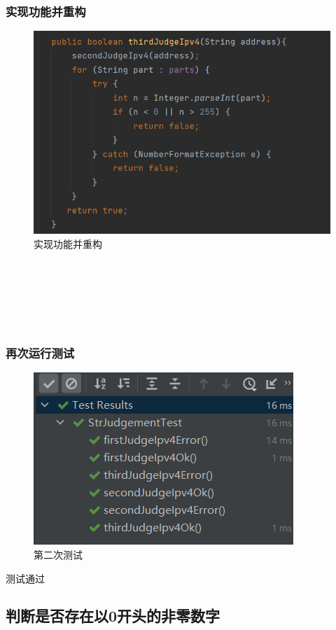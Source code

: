 \documentclass[a4paper]{article}
\begin{document}
\subsubsection*{实现功能并重构}
\begin{figure}[h]
    \centering
    \includegraphics[scale=0.8]{3.4.png}
    \caption{实现功能并重构}
    \label{fig:15}
\end{figure}
~\\~\\~\\~\\~\\
\subsubsection*{再次运行测试}
\begin{figure}[h]
    \centering
    \includegraphics[scale=0.9]{3.5.png}
    \caption{第二次测试}
    \label{fig:16}
\end{figure}
测试通过

\subsection{判断是否存在以0开头的非零数字}
\end{document}
